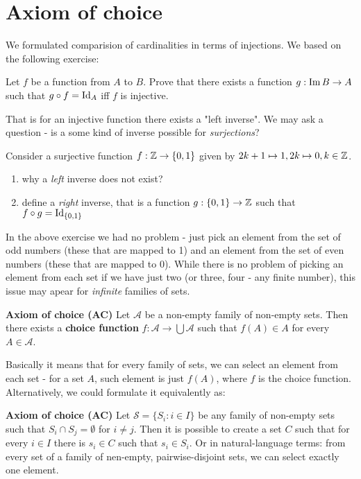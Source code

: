 
\section{Axiom of choice}
We formulated comparision of cardinalities in terms of injections. We based on the following exercise:

\begin{exercise}
  Let $f$ be a function from $A$ to $B$. Prove that there exists a function $g: \text{Im}\, B\to A$ such that $g\circ f=\text{Id}_A$ iff $f$ is injective.
\end{exercise}

That is for an injective function there exists a "left inverse". We may ask a question - is a some kind of inverse possible for \emph{surjections}?

\begin{exercise}
  Consider a surjective function $f: \mathbb Z \to \{0,1\}$ given by $2k+1 \mapsto 1, 2k\mapsto 0, k\in \mathbb Z$.
  \begin{enumerate}
    \item why a \emph{left} inverse does not exist?
    \item define a \emph{right} inverse, that is a function $g:\{0,1\}\to \mathbb Z$ such that $f\circ g=\text{Id}_{\{0,1\}}$
  \end{enumerate}
\end{exercise}

In the above exercise we had no problem - just pick an element from the set of odd numbers (these that are mapped to 1) and an element from the set of even numbers (these that are mapped to 0). While there is no problem of picking an element from each set if we have just two (or three, four - any finite number), this issue may apear for \emph{infinite} families
of sets.

\begin{definition}
  \textbf{Axiom of choice (AC)} Let $\mathcal A$ be a non-empty family of non-empty sets. Then there exists a \textbf{choice function} $f:\mathcal A\to \bigcup \mathcal A$ such that
  $f(A)\in A$ for every $A\in \mathcal A$.
\end{definition}

Basically it means that for every family of sets, we can select an element from each set - for a set $A$, such element is just $f(A)$, where $f$ is the choice function. Alternatively,
we could formulate it equivalently as:

\begin{definition}
  \textbf{Axiom of choice (AC)} Let $\mathcal S=\{S_i: i\in I\}$ be any family of non-empty sets such that $S_i\cap S_j=\emptyset$ for $i\neq j$. Then it is possible to create a set $C$ such that for every $i\in I$ there is $s_i\in C$ such that $s_i\in S_i$. Or in natural-language terms: from every set of a family of nen-empty, pairwise-disjoint sets, we can select exactly one element.
\end{definition}

